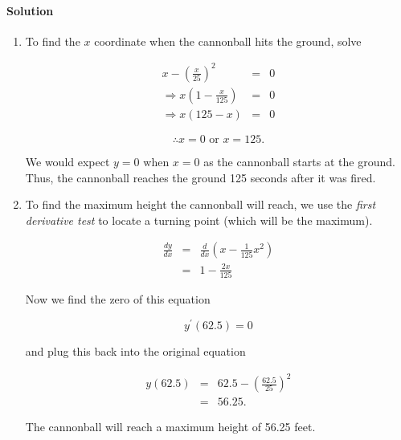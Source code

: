 

\paragraph{Solution}


\begin{enumerate}
	\item
		To find the $x$ coordinate when the cannonball hits the ground, solve

		\begin{eqnarray*}
			x-\left(\frac{x}{25}\right)^2&=&0\\
			\Rightarrow x\left(1-\frac{x}{125}\right)&=&0\\
			\Rightarrow x\left(125-x\right)&=&0
		\end{eqnarray*}

		\[\therefore x=0\mbox{ or }x=125.\]

		We would expect $y=0$ when $x=0$ as the cannonball starts at the ground. Thus, the cannonball reaches the ground 125 seconds after it was fired.

	\item
		To find the maximum height the cannonball will reach, we use the \emph{first derivative test} to locate a turning point (which will be the maximum).

		\begin{eqnarray*}
			\frac{dy}{dx}&=&\frac{d}{dx}\left(x-\frac{1}{125}x^2\right)\\
			&=&1-\frac{2x}{125}
		\end{eqnarray*}

		Now we find the zero of this equation

		\[y^\prime\left(62.5\right)=0\]

		and plug this back into the original equation

		\begin{eqnarray*}
			y\left(62.5\right)&=&62.5-\left(\frac{62.5}{25}\right)^2\\
			&=&56.25.
		\end{eqnarray*}

		The cannonball will reach a maximum height of 56.25 feet.
\end{enumerate}
